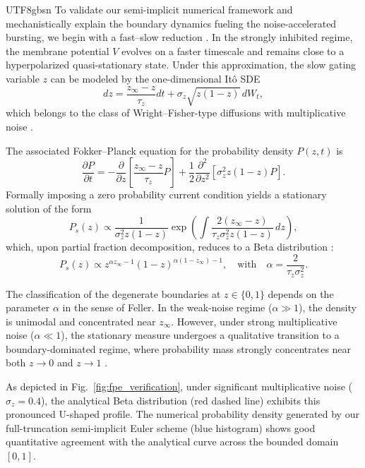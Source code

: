 ﻿\documentclass[reprint, amsmath, amssymb, aps, pre]{revtex4-2}
\begin{document}
\begin{CJK*}{UTF8}{gbsn}
To validate our semi-implicit numerical framework and mechanistically explain the boundary dynamics fueling the noise-accelerated bursting, we begin with a fast--slow reduction \cite{ermentrout2010mathematical}. In the strongly inhibited regime, the membrane potential $V$ evolves on a faster timescale and remains close to a hyperpolarized quasi-stationary state. Under this approximation, the slow gating variable $z$ can be modeled by the one-dimensional Itô SDE
\begin{equation}
    dz = \frac{z_\infty - z}{\tau_z} dt + \sigma_z \sqrt{z(1-z)} \, dW_t,
\end{equation}
which belongs to the class of Wright--Fisher-type diffusions with multiplicative noise \cite{ethier1986markov, karlin1981second}.

The associated Fokker--Planck equation for the probability density $P(z,t)$ is
\begin{equation}
    \frac{\partial P}{\partial t}
    = -\frac{\partial}{\partial z} \left[ \frac{z_\infty - z}{\tau_z} P \right]
    + \frac{1}{2} \frac{\partial^2}{\partial z^2} \left[ \sigma_z^2 z(1-z) P \right].
\end{equation}
Formally imposing a zero probability current condition yields a stationary solution of the form \cite{gardiner2009stochastic, kloeden1992numerical}
\begin{equation}
    P_s(z) \propto \frac{1}{\sigma_z^2 z(1-z)} 
    \exp \left( \int \frac{2(z_\infty - z)}{\tau_z \sigma_z^2 z(1-z)} \, dz \right),
\end{equation}
which, upon partial fraction decomposition, reduces to a Beta distribution \cite{karlin1981second}:
\begin{equation}
    P_s(z) \propto z^{\alpha z_\infty - 1} (1-z)^{\alpha (1-z_\infty) - 1},
    \quad \text{with} \quad \alpha = \frac{2}{\tau_z \sigma_z^2}.
\end{equation}

The classification of the degenerate boundaries at $z \in \{0,1\}$ depends on the parameter $\alpha$ in the sense of Feller. In the weak-noise regime ($\alpha \gg 1$), the density is unimodal and concentrated near $z_\infty$. However, under strong multiplicative noise ($\alpha \ll 1$), the stationary measure undergoes a qualitative transition to a boundary-dominated regime, where probability mass strongly concentrates near both $z \to 0$ and $z \to 1$ \cite{horsthemke1984noise}.

As depicted in Fig.~\ref{fig:fpe_verification}, under significant multiplicative noise ($\sigma_z = 0.4$), the analytical Beta distribution (red dashed line) exhibits this pronounced U-shaped profile. The numerical probability density generated by our full-truncation semi-implicit Euler scheme (blue histogram) shows good quantitative agreement with the analytical curve across the bounded domain $[0, 1]$.


\end{CJK*}
\end{document}
